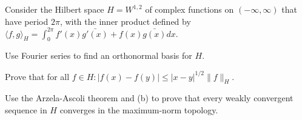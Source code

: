 Consider the Hilbert space $H=W^{1,2}$ of complex functions on
$(-\infty,\infty)$ that have period $2\pi$, with the inner product
defined by $\langle f,g
\rangle_H=\int_{0}^{2\pi}f'(x)\bar{g'(x)}+f(x)\bar{g(x)}dx$.
\begin{alist}
\item Use Fourier series to find an orthonormal basis for $H$.
\item Prove that for all $f\in H:|f(x)-f(y)|\leq
|x-y|^{1/2}\|f\|_{H}$.
\item Use the Arzela-Ascoli theorem and (b) to prove that every weakly
convergent sequence in $H$ converges in the maximum-norm topology.
\end{alist}
